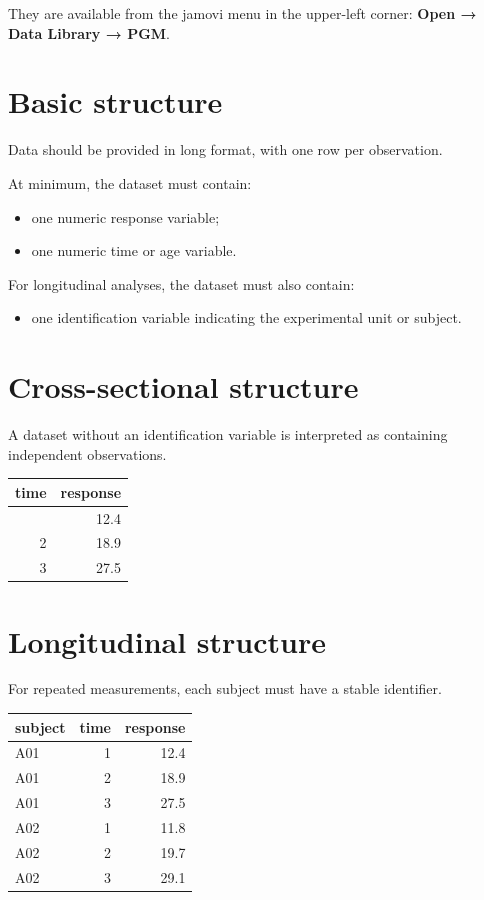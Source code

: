 \documentclass[
  english,
  letterpaper,
  DIV=11,
  numbers=noendperiod]{scrreprt}
\newcounter{none} %
\providecommand{\tightlist}{%
  \setlength{\itemsep}{0pt}\setlength{\parskip}{0pt}}
\begin{document}
They are available from the jamovi menu in the upper-left corner:
\textbf{Open → Data Library → PGM}.

\section{Basic structure}\label{basic-structure}

Data should be provided in long format, with one row per observation.

At minimum, the dataset must contain:

\begin{itemize}
\tightlist
\item
  one numeric response variable;
\item
  one numeric time or age variable.
\end{itemize}

For longitudinal analyses, the dataset must also contain:

\begin{itemize}
\tightlist
\item
  one identification variable indicating the experimental unit or
  subject.
\end{itemize}

\section{Cross-sectional structure}\label{cross-sectional-structure}

A dataset without an identification variable is interpreted as
containing independent observations.

{\def\LTcaptype{none} %
\begin{longtable}[]{@{}rr@{}}
\toprule\noalign{}
time & response \\
\midrule\noalign{}
\endhead
\bottomrule\noalign{}
\endlastfoot
1 & 12.4 \\
2 & 18.9 \\
3 & 27.5 \\
\end{longtable}
}

\section{Longitudinal structure}\label{longitudinal-structure}

For repeated measurements, each subject must have a stable identifier.

{\def\LTcaptype{none} %
\begin{longtable}[]{@{}lrr@{}}
\toprule\noalign{}
subject & time & response \\
\midrule\noalign{}
\endhead
\bottomrule\noalign{}
\endlastfoot
A01 & 1 & 12.4 \\
A01 & 2 & 18.9 \\
A01 & 3 & 27.5 \\
A02 & 1 & 11.8 \\
A02 & 2 & 19.7 \\
A02 & 3 & 29.1 \\
\end{longtable}
}
\end{document}
